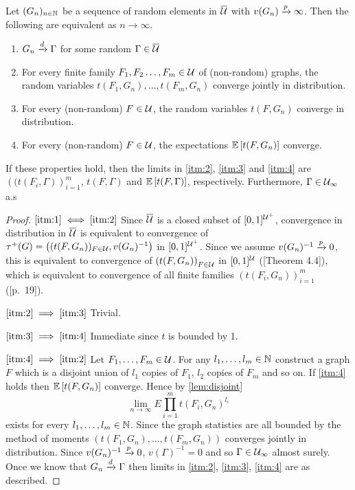 \documentclass{article}
\begin{document}
\begin{theorem}
  \label{thm:dconv-graph}
  Let $(G_n)_{n \in \N}$ be a sequence of random elements in $\Ug*$ with $v(G_n) \xrightarrow{p} \infty$. Then the following are equivalent as $n \to \infty$.
  \begin{enumerate}[label=(\roman*)]
    \item $G_n \xrightarrow{d} \Gamma$ for some random $\Gamma \in \Ug*$ \label{itm:1}
      \item For every finite family $F_1, F_2 \ldots, F_m \in \Ug$ of (non-random) graphs, the random variables $t(F_1, G_n),\dots,t(F_m,G_n)$ converge jointly in distribution.\label{itm:2}
      \item For every (non-random) $F \in \Ug$, the random variables $t(F, G_n)$ converge in distribution.\label{itm:3}
      \item For every (non-random) $F \in \Ug$, the expectations $\Ex[ t(F, G_n) ]$ converge.\label{itm:4}
    \end{enumerate}
    If these properties hold, then the limits in \ref{itm:2}, \ref{itm:3} and \ref{itm:4} are $\left( (t(F_i, \Gamma) \right)_{i=1}^m$, $t(F, \Gamma)$ and $\Ex[ t(F, \Gamma) ]$, respectively. Furthermore, $\Gamma \in \Ug_{\infty}$ a.s
\end{theorem}
\begin{proof}
  $\ref{itm:1} \iff \ref{itm:2}$ Since $\Ug*$ is a closed subset of $[0,1]^{\Ug^+}$, convergence in distribution in $\Ug*$ is equivalent to convergence of $\tau^+(G) = \left( (t(F, G_n))_{F \in \Ug}, v(G_n)^{-1} \right)$ in $[0,1]^{\Ug^+}$. Since we assume $v(G_n)^{-1} \xrightarrow{p} 0$, this is equivalent to convergence of $\left( t(F, G_n) \right)_{F \in \Ug}$ in $[0,1]^{\Ug}$ (\cite{weak-conv}[Theorem 4.4]), which is equivalent to convergence of all finite families $(t(F_i, G_n))_{i=1}^m$ (\cite{weak-conv}[p.~19]). 

  $\ref{itm:2} \implies \ref{itm:3}$ Trivial.

  $\ref{itm:3} \implies \ref{itm:4}$ Immediate since $t$ is bounded by 1.

  $\ref{itm:4} \implies \ref{itm:2}$ Let $F_1, \dots, F_m \in \Ug$. For any $l_1,\dots,l_m \in \N$ construct a graph $F$ which is a disjoint union of $l_1$ copies of $F_1$, $l_2$ copies of $F_m$ and so on. If \ref{itm:4} holds then $\Ex[ t(F, G_n) ]$ converge. Hence by \autoref{lem:disjoint} 
  \begin{equation}
    \lim_{n \to \infty}E{\prod_{i=1}^m t(F_i, G_n)^{l_i}}
    \label{eq:moments}
  \end{equation}
  exists for every $l_1,\dots, l_m \in \N$. Since the graph statistics are all bounded by the method of moments $(t(F_1, G_n),\dots, t(F_m, G_n))$ converges jointly in distribution.
  Since $v(G_n)^{-1} \xrightarrow{p} 0$, $v(\Gamma)^{-1} = 0$ and so $\Gamma \in \Ug_{\infty}$ almost surely. Once we know that $G_n \xrightarrow{d} \Gamma$ then limits in \ref{itm:2}, \ref{itm:3}, \ref{itm:4} are as described.
\end{proof}
\end{document}
